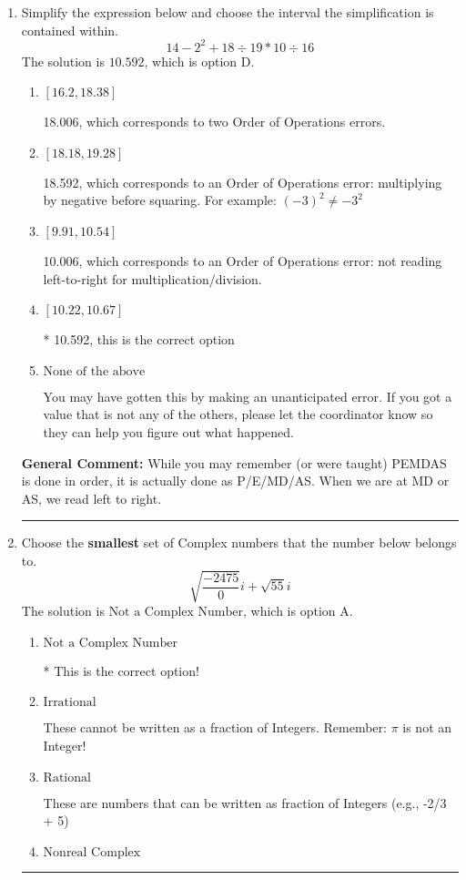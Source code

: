 \documentclass{extbook}[14pt]
\newcommand{\litem}[1]{\item #1

\rule{\textwidth}{0.4pt}}
\begin{document}
\begin{enumerate}\litem{
Simplify the expression below and choose the interval the simplification is contained within.
\[ 14 - 2^2 + 18 \div 19 * 10 \div 16 \]
The solution is \( 10.592 \), which is option D.\begin{enumerate}[label=\Alph*.]
\item \( [16.2, 18.38] \)

 18.006, which corresponds to two Order of Operations errors.
\item \( [18.18, 19.28] \)

 18.592, which corresponds to an Order of Operations error: multiplying by negative before squaring. For example: $(-3)^2 \neq -3^2$
\item \( [9.91, 10.54] \)

 10.006, which corresponds to an Order of Operations error: not reading left-to-right for multiplication/division.
\item \( [10.22, 10.67] \)

* 10.592, this is the correct option
\item \( \text{None of the above} \)

 You may have gotten this by making an unanticipated error. If you got a value that is not any of the others, please let the coordinator know so they can help you figure out what happened.
\end{enumerate}

\textbf{General Comment:} While you may remember (or were taught) PEMDAS is done in order, it is actually done as P/E/MD/AS. When we are at MD or AS, we read left to right.
}
\litem{
Choose the \textbf{smallest} set of Complex numbers that the number below belongs to.
\[ \sqrt{\frac{-2475}{0}} i+\sqrt{55}i \]
The solution is \( \text{Not a Complex Number} \), which is option A.\begin{enumerate}[label=\Alph*.]
\item \( \text{Not a Complex Number} \)

* This is the correct option!
\item \( \text{Irrational} \)

These cannot be written as a fraction of Integers. Remember: $\pi$ is not an Integer!
\item \( \text{Rational} \)

These are numbers that can be written as fraction of Integers (e.g., -2/3 + 5)
\item \( \text{Nonreal Complex} \)


\end{enumerate}}
\end{enumerate}
\end{document}
